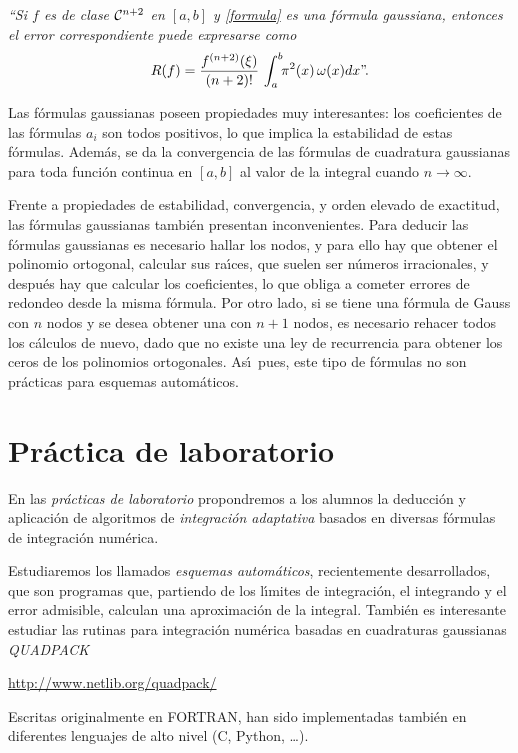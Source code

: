 \smallskip
\noindent
{\em
``Si $f$ es de clase ${\cal C}^{n+2}$ en $[a,b]$ y \eqref{formula} es una
f\'ormula gaussiana, entonces el error correspondiente puede expresarse como
$$
  R(f) = \frac{f^{(n+2)}(\xi)}{(n+2)!} \,\int_a^b\!\! \pi^2(x)\,\omega(x)dx
  \hbox{''.}
$$
}
\smallskip

Las f\'ormulas gaussianas poseen propiedades muy interesantes: los
coeficientes de las f\'ormulas $a_i$ son todos positivos, lo que implica la estabilidad de 
estas f\'ormulas. Adem\'as, se da la convergencia de las f\'ormulas
de cuadratura gaussianas para toda funci\'on continua en $[a,b]$ al valor de la integral cuando
$n \rightarrow \infty$.

Frente a propiedades de estabilidad, convergencia, y orden elevado de
exactitud, las f\'or\-mu\-las gaus\-sia\-nas tambi\'en pre\-sen\-tan in\-con\-ve\-nien\-tes. 
Para deducir las f\'ormulas gaussianas es necesario hallar los nodos, y para ello hay que obtener el polinomio ortogonal, calcular sus ra\'\i ces, que suelen ser n\'umeros irracionales, y despu\'es hay que calcular los coeficientes, lo que obliga a cometer errores de redondeo
desde la misma f\'ormula. Por otro lado, si se tiene una f\'ormula de Gauss
con $n$ nodos y se desea obtener una con $n+1$ nodos, es necesario rehacer todos
los c\'alculos de nuevo, dado que no existe una ley de recurrencia para obtener
los ceros de los polinomios ortogonales. As\'\i\  pues, este tipo de
f\'ormulas no son pr\'acticas para esquemas autom\'aticos.

\section{Pr\'actica de laboratorio}

En las {\it pr\'{a}cticas de laboratorio} propondremos a los alumnos la deducci\'on y aplicaci\'on de algoritmos de {\it integración adaptativa} basados en diversas f\'ormulas de integraci\'on num\'erica. 

Estudiaremos los llamados {\it esquemas autom\'aticos}, recientemente desarrollados, que son programas que,
partiendo de los l\'\i mites de integraci\'on, el integrando y el error
admisible, calculan una aproximaci\'on de la integral.  Tambi\'en es interesante estudiar las rutinas para integraci\'{o}n num\'erica
basadas en cuadraturas gaussianas \textit{QUADPACK}

\url{http://www.netlib.org/quadpack/}

Escritas originalmente en FORTRAN, han sido implementadas también en
diferentes lenguajes de alto nivel (C, Python, \ldots).


